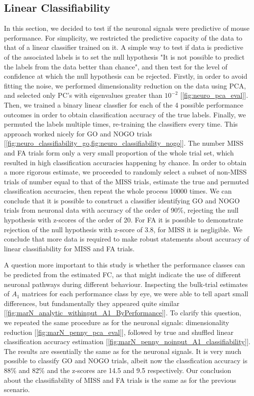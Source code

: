 \documentclass[a4paper,10pt]{article}
\begin{document}
\subsection{Linear Classifiability}

In this section, we decided to test if the neuronal signals were predictive of mouse performance. For simplicity, we restricted the predictive capacity of the data to that of a linear classifier trained on it. A simple way to test if data is predictive of the associated labels is to set the null hypothesis "It is not possible to predict the labels from the data better than chance", and then test for the level of confidence at which the null hypothesis can be rejected. Firstly, in order to avoid fitting the noise, we performed dimensionality reduction on the data using PCA, and selected only PC's with eigenvalues greater than $10^{-2}$ [\cref{fig:neuro_pca_eval}]. Then, we trained a binary linear classfier for each of the 4 possible performance outcomes in order to obtain classification accuracy of the true labels. Finally, we permuted the labels multiple times, re-training the classifiers every time. This approach worked nicely for GO and NOGO trials [\cref{fig:neuro_classifiability_go,fig:neuro_classifiability_nogo}]. The number MISS and FA trials form only a very small proportion of the whole trial set, which resulted in high classification accuracies happening by chance. In order to obtain a more rigorous estimate, we proceeded to randomly select a subset of non-MISS trials of number equal to that of the MISS trials, estimate the true and permuted classification accuracies, then repeat the whole process 10000 times. We can conclude that it is possible to construct a classifier identifying GO and NOGO trials from neuronal data with accuracy of the order of 90\%, rejecting the null hypothesis with z-scores of the order of 20. For FA it is possible to demonstrate rejection of the null hypothesis with z-score of 3.8, for MISS it is negligible. We conclude that more data is required to make robust statements about accuracy of linear classifiability for MISS and FA trials.

A question more important to this study is whether the performance classes can be predicted from the estimated FC, as that might indicate the use of different neuronal pathways during different behaviour. Inspecting the bulk-trial estimates of $A_1$ matrices for each performance class by eye, we were able to tell apart small differences, but fundamentally they appeared quite similar [\cref{fig:marN_analytic_withinput_A1_ByPerformance}]. To clarify this question, we repeated the same procedure as for the neuronal signals: dimensionality reduction [\cref{fig:marN_penny_pca_eval}], followed by true and shuffled linear classification accuracy estimation [\cref{fig:marN_penny_noinput_A1_classifiability}]. The results are essentially the same as for the neuronal signals. It is very much possible to classify GO and NOGO trials, albeit now the classfication accuracy is 88\% and 82\% and the z-scores are 14.5 and 9.5 respectively. Our conclusion about the classifiability of MISS and FA trials is the same as for the previous scenario.
\end{document}
